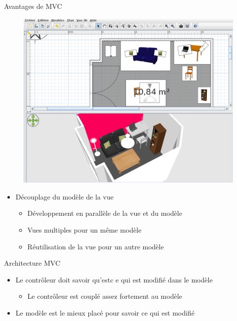 \documentclass[xcolor=table]{beamer}
\begin{document}
\begin{frame}{Avantages de MVC}
\begin{figure}
    \centering
    \includegraphics[scale=0.18]{fig/multi-view.png}
\end{figure}
\begin{itemize}
    \item Découplage du modèle de la vue
    \begin{itemize}
        \item Développement en parallèle de la vue et du modèle
        \item Vues multiples pour un même modèle
        \item Réutilisation de la vue pour un autre modèle
    \end{itemize}
\end{itemize}
\end{frame}

\begin{frame}{Architecture MVC}
\begin{figure}
\centering
{}
\end{figure}
\begin{itemize}
    \item Le contrôleur doit savoir qu'estc e qui est modifié dans le modèle
    \begin{itemize}
        \item Le contrôleur est couplé assez fortement au modèle
    \end{itemize}
    \item Le modèle est le mieux placé pour savoir ce qui est modifié
\end{itemize}
\end{frame}
\end{document}
